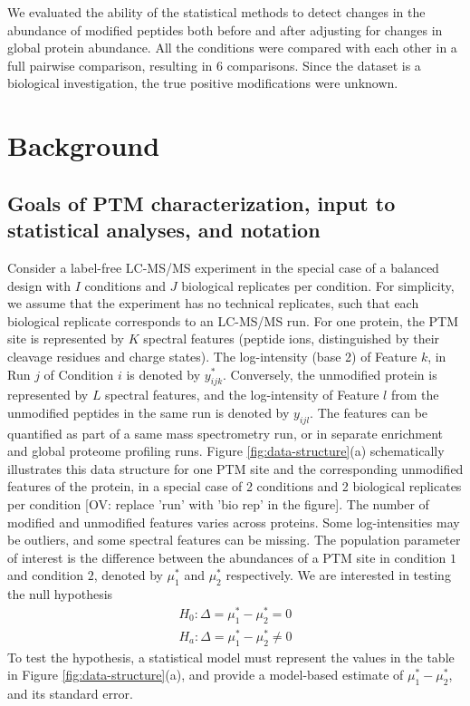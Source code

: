 \documentclass[mcp]{article}
\numberwithin{table}{section}
\def\todo#1{{\color{red}[#1]}}
\begin{document}
\medskip {} We evaluated the ability of the statistical methods to detect  changes in the abundance of modified peptides both before and after adjusting for changes in global protein abundance. All the conditions were compared with each other in a full pairwise comparison, resulting in 6 comparisons. Since the dataset is a biological investigation, the true positive modifications were unknown.

\section*{Background}

\subsection*{Goals of PTM characterization, input to statistical analyses, and notation}

Consider a label-free LC-MS/MS experiment in the special case of a balanced design with $I$ conditions and $J$ biological replicates per condition. For simplicity, we assume that the experiment has no technical replicates, such that each biological replicate corresponds to an LC-MS/MS run.  For one protein, the PTM site is represented by $K$ spectral features (peptide ions, distinguished by their cleavage residues and charge states). The log-intensity (base 2) of Feature $k$, in Run $j$ of Condition $i$ is denoted by $y_{ijk}^{\ast}$. Conversely, the unmodified protein is represented by $L$ spectral features, and the log-intensity of Feature $l$ from the unmodified peptides in the same run is denoted by $y_{ijl}$. The features can be quantified as part of a same mass spectrometry run, or in separate enrichment and global proteome profiling runs.
Figure \ref{fig:data-structure}(a) schematically illustrates this data structure for one PTM site and the corresponding unmodified features of the protein, in a special case of 2 conditions and 2 biological replicates per condition \todo{OV: replace 'run' with 'bio rep' in the figure}. The number of modified and unmodified features varies across proteins. Some log-intensities may be outliers, and some spectral features can be missing. The population parameter of interest is the difference between the abundances of a PTM site in condition $1$ and condition $2$, denoted by $\mu_1^{\ast}$ and $\mu_2^{\ast}$ respectively. We are interested in testing the null hypothesis
\begin{equation}
\begin{aligned}
H_{0}: \Delta = \mu_{1}^{\ast} - \mu_{2}^{\ast} = 0 \\
H_{a}: \Delta = \mu_{1}^{\ast} - \mu_{2}^{\ast} \neq 0
\end{aligned}
\label{eq:conv_null_hyp}
\end{equation}
To test the hypothesis, a statistical model must represent the values in the table in Figure \ref{fig:data-structure}(a), and provide a model-based estimate of $\mu_{1}^{\ast} - \mu_{2}^{\ast}$, and its standard error.
\end{document}
